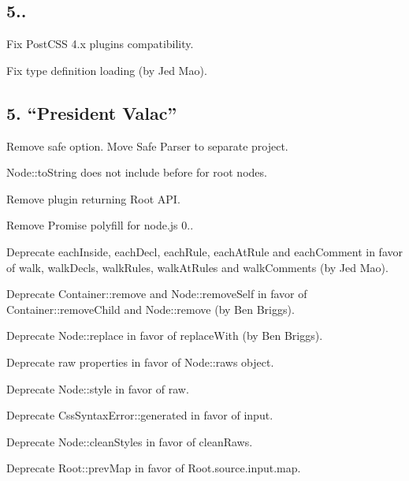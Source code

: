 \subsection*{5..}


\begin{DoxyItemize}
\item Fix Post\+C\+SS 4.\+x plugins compatibility.
\item Fix type definition loading (by Jed Mao).
\end{DoxyItemize}

\subsection*{5. “\+President Valac”}


\begin{DoxyItemize}
\item Remove {\ttfamily safe} option. Move Safe Parser to separate project.
\item {\ttfamily Node\+::to\+String} does not include {\ttfamily before} for root nodes.
\item Remove plugin returning {\ttfamily Root} A\+PI.
\item Remove Promise polyfill for node.\+js 0..
\item Deprecate {\ttfamily each\+Inside}, {\ttfamily each\+Decl}, {\ttfamily each\+Rule}, {\ttfamily each\+At\+Rule} and {\ttfamily each\+Comment} in favor of {\ttfamily walk}, {\ttfamily walk\+Decls}, {\ttfamily walk\+Rules}, {\ttfamily walk\+At\+Rules} and {\ttfamily walk\+Comments} (by Jed Mao).
\item Deprecate {\ttfamily Container\+::remove} and {\ttfamily Node\+::remove\+Self} in favor of {\ttfamily Container\+::remove\+Child} and {\ttfamily Node\+::remove} (by Ben Briggs).
\item Deprecate {\ttfamily Node\+::replace} in favor of {\ttfamily replace\+With} (by Ben Briggs).
\item Deprecate raw properties in favor of {\ttfamily Node\+::raws} object.
\item Deprecate {\ttfamily Node\+::style} in favor of {\ttfamily raw}.
\item Deprecate {\ttfamily Css\+Syntax\+Error\+::generated} in favor of {\ttfamily input}.
\item Deprecate {\ttfamily Node\+::clean\+Styles} in favor of {\ttfamily clean\+Raws}.
\item Deprecate {\ttfamily Root\+::prev\+Map} in favor of {\ttfamily Root.\+source.\+input.\+map}.

\end{DoxyItemize}
